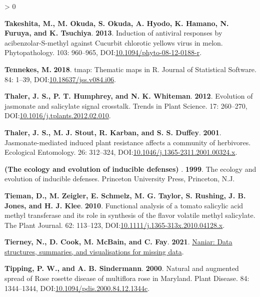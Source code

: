\documentclass{ufdissertation}[overrideChapters] %
\newlength{\cslhangindent}
\newenvironment{CSLReferences}[2] %
 {%
  \setlength{\parindent}{0pt}
  \ifodd #1 \everypar{\setlength{\hangindent}{\cslhangindent}}\ignorespaces\fi
  \ifnum #2 > 0
  \setlength{\parskip}{#2\baselineskip}
  \fi
 }%
 {}
\begin{document}
{\begin{CSLReferences}{1}{1}
\leavevmode{}%
\textbf{Takeshita, M., M. Okuda, S. Okuda, A. Hyodo, K. Hamano, N. Furuya, and K. Tsuchiya}. \textbf{2013}. Induction of antiviral responses by acibenzolar-{S}-methyl against {Cucurbit chlorotic yellows virus} in melon. Phytopathology{\textregistered}. 103: 960--965, DOI:\href{https://doi.org/10.1094/phyto-08-12-0188-r}{10.1094/phyto-08-12-0188-r}.

\leavevmode{}%
\textbf{Tennekes, M.} \textbf{2018}. {tmap}: Thematic maps in {R}. Journal of Statistical Software. 84: 1--39, DOI:\href{https://doi.org/10.18637/jss.v084.i06}{10.18637/jss.v084.i06}.

\leavevmode{}%
\textbf{Thaler, J. S., P. T. Humphrey, and N. K. Whiteman}. \textbf{2012}. Evolution of jasmonate and salicylate signal crosstalk. Trends in Plant Science. 17: 260--270, DOI:\href{https://doi.org/10.1016/j.tplants.2012.02.010}{10.1016/j.tplants.2012.02.010}.

\leavevmode{}%
\textbf{Thaler, J. S., M. J. Stout, R. Karban, and S. S. Duffey}. \textbf{2001}. Jasmonate-mediated induced plant resistance affects a community of herbivores. Ecological Entomology. 26: 312--324, DOI:\href{https://doi.org/10.1046/j.1365-2311.2001.00324.x}{10.1046/j.1365-2311.2001.00324.x}.

\leavevmode{}%
\textbf{(The ecology and evolution of inducible defenses) }. \textbf{1999}. The ecology and evolution of inducible defenses. Princeton University Press, Princeton, N.J.

\leavevmode{}%
\textbf{Tieman, D., M. Zeigler, E. Schmelz, M. G. Taylor, S. Rushing, J. B. Jones, and H. J. Klee}. \textbf{2010}. Functional analysis of a tomato salicylic acid methyl transferase and its role in synthesis of the flavor volatile methyl salicylate. The Plant Journal. 62: 113--123, DOI:\href{https://doi.org/10.1111/j.1365-313x.2010.04128.x}{10.1111/j.1365-313x.2010.04128.x}.

\leavevmode{}%
\textbf{Tierney, N., D. Cook, M. McBain, and C. Fay}. \textbf{2021}. \href{https://CRAN.R-project.org/package=naniar}{Naniar: Data structures, summaries, and visualisations for missing data}.

\leavevmode{}%
\textbf{Tipping, P. W., and A. B. Sindermann}. \textbf{2000}. Natural and augmented spread of {Rose rosette disease} of multiflora rose in {Maryland}. Plant Disease. 84: 1344--1344, DOI:\href{https://doi.org/10.1094/pdis.2000.84.12.1344c}{10.1094/pdis.2000.84.12.1344c}.


\end{CSLReferences}}
\end{document}
